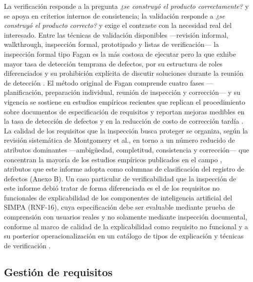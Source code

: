 \documentclass[11pt,a4paper]{article}
\begin{document}
La verificación responde a la pregunta \emph{¿se construyó el producto correctamente?} y se
apoya en criterios internos de consistencia; la validación responde a \emph{¿se construyó el
producto correcto?} y exige el contraste con la necesidad real del interesado. Entre las técnicas
de validación disponibles ---revisión informal, walkthrough, inspección formal, prototipado y
listas de verificación--- la inspección formal tipo Fagan es la más costosa de ejecutar pero la
que exhibe mayor tasa de detección temprana de defectos, por su estructura de roles
diferenciados y su prohibición explícita de discutir soluciones durante la reunión de detección
\cite{yousaf2022}. El método original de Fagan comprende cuatro fases ---planificación,
preparación individual, reunión de inspección y corrección--- y su vigencia se sostiene en
estudios empíricos recientes que replican el procedimiento sobre documentos de especificación de
requisitos y reportan mejoras medibles en la tasa de detección de defectos y en la reducción de
costo de corrección tardía \cite{yousaf2022}. La calidad de los requisitos que la inspección
busca proteger se organiza, según la revisión sistemática de Montgomery et al., en torno a un
número reducido de atributos dominantes ---ambigüedad, completitud, consistencia y
corrección--- que concentran la mayoría de los estudios empíricos publicados en el campo
\cite{montgomery2022}, atributos que este informe adopta como columnas de clasificación del
registro de defectos (Anexo B). Un caso particular de verificabilidad que la inspección de este
informe debió tratar de forma diferenciada es el de los requisitos no funcionales de
explicabilidad de los componentes de inteligencia artificial del SIMPA (RNF-16), cuya
especificación debe ser evaluable mediante prueba de comprensión con usuarios reales y no
solamente mediante inspección documental, conforme al marco de calidad de la explicabilidad como
requisito no funcional \cite{chazette2020} y a su posterior operacionalización en un catálogo de
tipos de explicación y técnicas de verificación \cite{chazette2021,chazette2022}.

\subsection{Gestión de requisitos}
\end{document}
